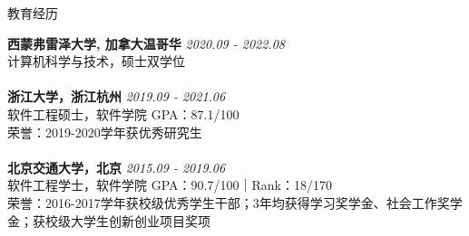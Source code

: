 \documentclass{resume} %
\begin{document}

\begin{rSection}{教育经历}

{\bf 西蒙弗雷泽大学, 加拿大温哥华} \hfill {\em 2020.09 - 2022.08} 
\\ 计算机科学与技术，硕士双学位\\
\\{\bf 浙江大学，浙江杭州} \hfill {\em 2019.09 - 2021.06} 
\\ 软件工程硕士，软件学院 \hfill {GPA：87.1/100 }
\\荣誉：2019-2020学年获优秀研究生\\
\\{\bf 北京交通大学，北京} \hfill {\em 2015.09 - 2019.06} 
\\ 软件工程学士，软件学院 \hfill {GPA：90.7/100｜Rank：18/170 }
\\荣誉：2016-2017学年获校级优秀学生干部；3年均获得学习奖学金、社会工作奖学金；获校级大学生创新创业项目奖项
\end{rSection}

\end{document}
